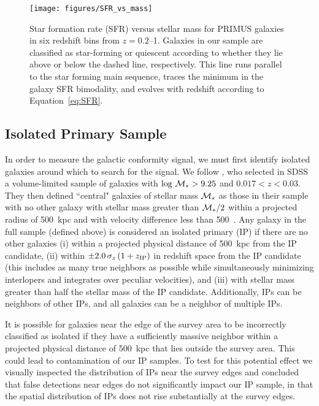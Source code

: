 \begin{figure}
  \centering
  \texttt{[image: figures/SFR\_vs\_mass]}
  \caption{Star formation rate (SFR) versus stellar mass for PRIMUS galaxies in six redshift bins from ${z=0.2}$--1.
Galaxies in our sample are classified as star-forming or quiescent according to whether they lie above or below the dashed line, respectively.
This line runs parallel to the star forming main sequence, traces the minimum in the galaxy SFR bimodality, and evolves with redshift according to Equation~\ref{eq:SFR}.
}
  \label{fig:SFR_vs_mass}
\end{figure}


\subsection{Isolated Primary Sample}\label{sec:IPsample}

In order to measure the galactic conformity signal, we must first identify isolated galaxies around which to search for the signal.
We follow \citet{Kauffmann13}, who selected in SDSS a volume-limited sample of galaxies with $\log\,\mstar>9.25$ and $0.017<z<0.03$.  They then defined ``central" galaxies of stellar mass $\mstar$ as those in their sample with no other galaxy with stellar mass greater than $\mstar/2$ within a projected radius of 500~kpc and with velocity difference less than 500~\kms.  Any galaxy in the full sample (defined above) is considered an isolated primary (IP) if there are no other galaxies
(i) within a projected physical distance of 500~kpc from the IP candidate,
(ii) within ${\pm 2.0\,\sigma_{z}\,(1 + z_{\rm IP})}$ in redshift space from the IP candidate (this includes as many true neighbors as possible while simultaneously minimizing interlopers and integrates over peculiar velocities), and
(iii) with stellar mass greater than half the stellar mass of the IP candidate.
Additionally, IPs can be neighbors of other IPs, and all galaxies can be a neighbor of multiple IPs. 

It is possible for galaxies near the edge of the survey area to be incorrectly classified as isolated if they have a sufficiently massive neighbor within a projected physical distance of 500~kpc that lies outside the survey area.
This could lead to contamination of our IP samples.
To test for this potential effect we visually inspected the distribution of IPs near the survey edges and concluded that false detections near edges do not significantly impact our IP sample, in that the spatial distribution of IPs does not rise substantially at the survey edges. 

